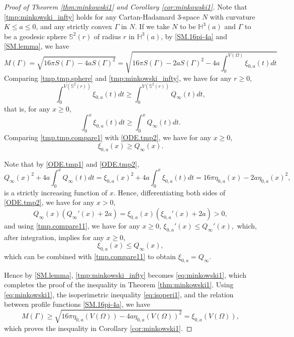 \documentclass[11pt]{amsart}
\theoremstyle{definition}
\newcommand{\HH}{\mathbb{H}}
\newcommand{\SSS}{\mathbb{S}}
\theoremstyle{remark}
\numberwithin{equation}{section}
\begin{document}
\begin{proof}[Proof of Theorem \ref{thm:minkowski1} and Corollary \ref{cor:minkowski1}]
	Note that \eqref{tmp:minkowski_infty} holds for any Cartan-Hadamard 3-space $N$ with curvature $K\leq a\leq0$, and any strictly convex $\Gamma$ in $N$. If we take $N$ to be $\HH^3(a)$ and $\Gamma$ to be a geodesic sphere $\SSS^2(r)$ of radius $r$ in $\HH^3(a)$, by \eqref{SM.16pi-4a} and \eqref{SM.lemma}, we have
	\begin{equation}\label{tmp.tmp.sphere}
		M(\Gamma) = \sqrt{16\pi S(\Gamma) - 4a S(\Gamma)^2}
		= \sqrt{16\pi S(\Gamma) - 2a S(\Gamma)^2 - 4a \int_{0}^{V(\Omega)}\xi_{0,a}(t)dt}
	\end{equation}
	Comparing \eqref{tmp.tmp.sphere} and \eqref{tmp:minkowski_infty}, we have for any $r\geq0$,
	$$
	\int_{0}^{V(\SSS^2(r))}\xi_{0,a}(t)dt
	\geq
	\int_{0}^{V(\SSS^2(r))}Q_{\infty}(t)dt,
	$$
	that is, for any $x\geq0$,
	\begin{equation}\label{tmp.tmp.compare1}
		\int_{0}^{x} \xi_{0,a}(t)dt
		\geq
		\int_{0}^{x} Q_{\infty}(t)dt.
	\end{equation}
	Comparing \eqref{tmp.tmp.compare1} with \eqref{ODE.tmp2}, we have for any $x\geq0$, 
	\begin{equation}\label{tmp.compare11}
		\xi_{0,a}(x) \geq Q_{\infty}(x).
	\end{equation}
	
	Note that by \eqref{ODE.tmp1} and \eqref{ODE.tmp2}, 
	\begin{equation*}
		Q_{\infty}(x)^2 + 4a \int_{0}^{x} Q_{\infty}(t)dt
		=
		\xi_{0,a}(x)^2 + 4a \int_{0}^{x} \xi_{0,a}(t) dt
		=
		16\pi \eta_{0,a}(x) -2a \eta_{0,a}(x)^2,
	\end{equation*}
	is a strictly increasing function of $x$. Hence, differentiating both sides of \eqref{ODE.tmp2}, we have for any $x>0$,
	\begin{equation}
		\label{ODE.tmp3}
		Q_{\infty}(x) \left( Q_{\infty}'(x) + 2a \right)
		=
		\xi_{0,a}(x) \left( \xi_{0,a}'(x) + 2a \right) > 0,
	\end{equation}
	and using \eqref{tmp.compare11}, we have for any $x\geq0$,
	$
	\xi_{0,a}'(x) \leq Q_{\infty}'(x),
	$
	which, after integration, implies for any $x\geq0$,
	\begin{equation*}
		\xi_{0,a}(x) \leq Q_{\infty}(x),
	\end{equation*}
	which can be combined with \eqref{tmp.compare11} to obtain $\xi_{0,a} = Q_{\infty}$.
	
	Hence by \eqref{SM.lemma}, \eqref{tmp:minkowski_infty} becomes
	\eqref{eq:minkowski1}, which completes the proof of the inequality in Theorem \ref{thm:minkowski1}. Using \eqref{eq:minkowski1}, the isoperimetric inequality \eqref{eq:isoperi1}, and the relation between profile functions \eqref{SM.16pi-4a}, we have
	\begin{equation}\label{eq:cor-minkowski}
		M(\Gamma) \geq \sqrt{16\pi \eta_{0,a}(V(\Omega)) - 4a \eta_{0,a}(V(\Omega))^2} = \xi_{0,a}(V(\Omega)),
	\end{equation}
	which proves the inequality in Corollary \ref{cor:minkowski1}.
	

\end{proof}
\end{document}
